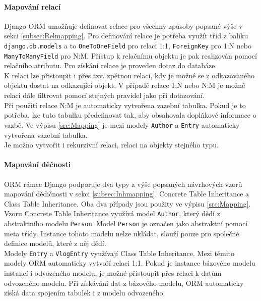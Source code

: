 \documentclass[ing,male,java,dept456]{diploma}						%
\begin{document}
\paragraph{Mapování relací} Django ORM umožňuje definovat relace pro všechny způsoby popsané výše v sekci \ref{subsec:Relmapping}. Pro definování relace je potřeba využít tříd z balíku \lstinline[style=custompython]|django.db.models| a to \lstinline[style=custompython]|OneToOneField| pro relaci 1:1, \lstinline[style=custompython]|ForeignKey| pro 1:N nebo \lstinline[style=custompython]|ManyToManyField| pro N:M. Přístup k relačnímu objektu je pak realizován pomocí relačního atributu. Pro získání relace je proveden dotaz do databáze. \\
K relaci lze přistoupit i přes tzv. zpětnou relaci, kdy je možné se z odkazovaného objektu dostat na odkazující objekt. V případě relace 1:N nebo N:M je možné relaci dále filtrovat pomocí stejných pravidel jako při dotazování. \\
Při použití relace N:M je automaticky vytvořena vazební tabulka. Pokud je to potřeba, lze tuto tabulku předefinovat tak, aby obsahovala doplňkové informace o vazbě. Ve výpisu \ref{src:Mapping} je mezi modely \lstinline[style=inlinepython]|Author| a \lstinline[style=inlinepython]|Entry| automaticky vytvořena vazební tabulka. \\
Je možno vytvořit i rekurzivní relaci, relaci na objekty stejného typu. \\

\paragraph{Mapování děčnosti}

ORM rámce Django podporuje dva typy z výše popsaných návrhových vzorů mapování dědičnosti v sekci \ref{subsec:Inhmapping}. Concrete Table Inheritance a Class Table Inheritance. Oba dva případy jsou použity ve výpisu \ref{src:Mapping}. \\
Vzoru Concrete Table Inheritance využívá model \lstinline[style=inlinepython]|Author|, který dědí z abstraktního modelu \lstinline[style=inlinepython]|Person|. Model \lstinline[style=inlinepython]|Person| je označen jako abstraktní pomocí meta třídy. Instance tohoto modelu nelze ukládat, slouží pouze pro společné definice modelů, které z něj dědí. \\
Modely \lstinline[style=inlinepython]|Entry| a \lstinline[style=inlinepython]|VlogEntry| využívají Class Table Inheritance. Mezi těmito modely ORM automaticky vytvoří relaci 1:1. Pokud je instance bázového modelu instancí i odvozeného modelu, je možné přistoupit přes relaci k datům odvozeného modelu. Při získávání dat z bázového modelu, ORM automaticky získá data spojením tabulek i z modelu odvozeného.
\end{document}

